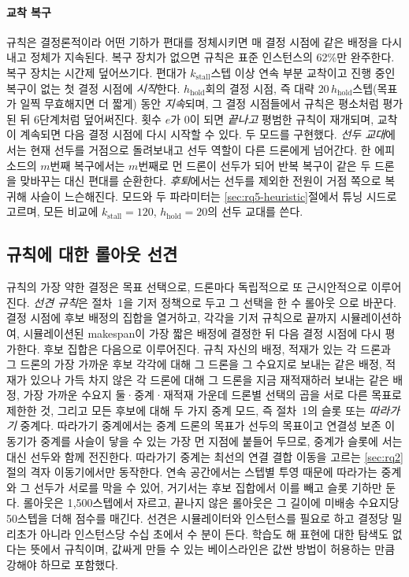 \documentclass[final,5p,times,twocolumn]{elsarticle}
\begin{document}
\paragraph{교착 복구}
규칙은 결정론적이라 어떤 기하가 편대를 정체시키면 매 결정 시점에 같은 배정을 다시 내고 정체가
지속된다. 복구 장치가 없으면 규칙은 표준 인스턴스의 62\%만 완주한다. 복구 장치는 시간제 덮어쓰기다.
편대가 $k_{\mathrm{stall}}$스텝 이상 연속 부분 교착이고 진행 중인 복구이 없는 첫 결정 시점에
\emph{시작}한다. $h_{\mathrm{hold}}$회의 결정 시점, 즉 대략 $20\,h_{\mathrm{hold}}$스텝(목표가
일찍 무효해지면 더 짧게) 동안 \emph{지속}되며, 그 결정 시점들에서 규칙은 평소처럼 평가된 뒤 6단계처럼
덮어써진다. 횟수 $e$가 0이 되면 \emph{끝나고} 평범한 규칙이 재개되며, 교착이 계속되면 다음 결정
시점에 다시 시작할 수 있다. 두 모드를 구현했다. \emph{선두 교대}에서는 현재 선두를 거점으로
돌려보내고 선두 역할이 다른 드론에게 넘어간다. 한 에피소드의 $m$번째 복구에서는 $m$번째로 먼 드론이
선두가 되어 반복 복구이 같은 두 드론을 맞바꾸는 대신 편대를 순환한다. \emph{후퇴}에서는 선두를
제외한 전원이 거점 쪽으로 복귀해 사슬이 느슨해진다. 모드와 두 파라미터는 \ref{sec:rq5-heuristic}절에서
튜닝 시드로 고르며, 모든 비교에 $k_{\mathrm{stall}} = 120$, $h_{\mathrm{hold}} = 20$의 선두 교대를
쓴다.

\subsection{규칙에 대한 롤아웃 선견}
\label{sec:lookahead}

규칙의 가장 약한 결정은 목표 선택으로, 드론마다 독립적으로 또 근시안적으로 이루어진다. \emph{선견
규칙}은 절차~1을 기저 정책으로 두고 그 선택을 한 수 롤아웃 \cite{bertsekas1997rollout}으로 바꾼다.
결정 시점에 후보 배정의 집합을 열거하고, 각각을 기저 규칙으로 끝까지 시뮬레이션하여, 시뮬레이션된
makespan이 가장 짧은 배정에 결정한 뒤 다음 결정 시점에 다시 평가한다. 후보 집합은 다음으로 이루어진다.
규칙 자신의 배정, 적재가 있는 각 드론과 그 드론의 가장 가까운 후보 각각에 대해 그 드론을 그 수요지로
보내는 같은 배정, 적재가 있으나 가득 차지 않은 각 드론에 대해 그 드론을 지금 재적재하러 보내는 같은
배정, 가장 가까운 수요지 둘·중계·재적재 가운데 드론별 선택의 곱을 서로 다른 목표로 제한한 것, 그리고
모든 후보에 대해 두 가지 중계 모드, 즉 절차~1의 슬롯 또는 \emph{따라가기} 중계다. 따라가기 중계에서는
중계 드론의 목표가 선두의 목표이고 연결성 보존 이동기가 중계를 사슬이 닿을 수 있는 가장 먼 지점에
붙들어 두므로, 중계가 슬롯에 서는 대신 선두와 함께 전진한다. 따라가기 중계는 최선의 연결 결합 이동을
고르는 \ref{sec:rq2}절의 격자 이동기에서만 동작한다. 연속 공간에서는 스텝별 투영 때문에 따라가는
중계와 그 선두가 서로를 막을 수 있어, 거기서는 후보 집합에서 이를 빼고 슬롯 기하만 둔다. 롤아웃은
1{,}500스텝에서 자르고, 끝나지 않은 롤아웃은 그 길이에 미배송 수요지당 50스텝을 더해 점수를 매긴다.
선견은 시뮬레이터와 인스턴스를 필요로 하고 결정당 밀리초가 아니라 인스턴스당 수십 초에서 수 분이 든다.
학습도 해 표현에 대한 탐색도 없다는 뜻에서 규칙이며, 값싸게 만들 수 있는 베이스라인은 값싼 방법이
허용하는 만큼 강해야 하므로 포함했다.
\end{document}
